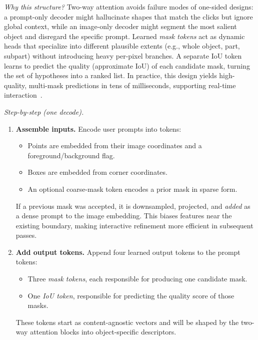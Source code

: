 \begin{enrichment}
\begin{enrichment}
		\medskip \noindent\textit{Why this structure?}
		Two-way attention avoids failure modes of one-sided designs: a prompt-only decoder might hallucinate shapes that match the clicks but ignore global context, while an image-only decoder might segment the most salient object and disregard the specific prompt. Learned \emph{mask tokens} act as dynamic heads that specialize into different plausible extents (e.g., whole object, part, subpart) without introducing heavy per-pixel branches. A separate IoU token learns to predict the quality (approximate IoU) of each candidate mask, turning the set of hypotheses into a ranked list. In practice, this design yields high-quality, multi-mask predictions in tens of milliseconds, supporting real-time interaction~\cite{kirillov2023_sam}.
		
		\noindent\textit{Step-by-step (one decode).}
		\begin{enumerate}
			\item \textbf{Assemble inputs.}
			Encode user prompts into tokens:
			\begin{itemize}
				\item Points are embedded from their image coordinates and a foreground/background flag.
				\item Boxes are embedded from corner coordinates.
				\item An optional coarse-mask token encodes a prior mask in sparse form.
			\end{itemize}
			If a previous mask was accepted, it is downsampled, projected, and \emph{added} as a dense prompt to the image embedding. This biases features near the existing boundary, making interactive refinement more efficient in subsequent passes.
			
			\item \textbf{Add output tokens.}
			Append four learned output tokens to the prompt tokens:
			\begin{itemize}
				\item Three \emph{mask tokens}, each responsible for producing one candidate mask.
				\item One \emph{IoU token}, responsible for predicting the quality score of those masks.
			\end{itemize}
			These tokens start as content-agnostic vectors and will be shaped by the two-way attention blocks into object-specific descriptors.
			

\end{enumerate}
\end{enrichment}
\end{enrichment}
